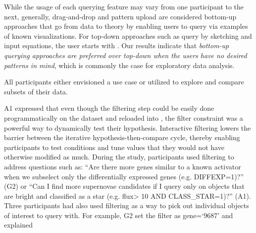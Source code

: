 \par While the usage of each querying feature may vary from one participant to the next, generally,  drag-and-drop and pattern upload are considered bottom-up approaches that go from data to theory by enabling users to query via examples of known visualizations. For top-down approaches such as query by sketching and input equations, the user starts with . Our results indicate that \emph{bottom-up querying approaches are preferred over top-down when the users have no desired patterns in mind}, which is commonly the case for exploratory data analysis.
\par All participants either envisioned a use case or utilized  to explore and compare subsets of their data. 
\par A1 expressed that even though the filtering step could be easily done programmatically on the dataset and reloaded into \zv, the filter constraint was a powerful way to dynamically test their hypothesis. Interactive filtering lowers the barrier between the iterative hypothesis-then-compare cycle, thereby enabling participants to test conditions and tune values that they would not have otherwise modified as much.
During the study, participants used filtering to address questions such as: ``Are there more genes similar to a known activator when we subselect only the differentially expressed genes (e.g. DIFFEXP=1)?'' (G2) or ``Can I find more supernovae candidates if I query only on objects that are bright and classified as a star (e.g. flux\textgreater
10 AND CLASS\_STAR=1)?'' (A1). Three participants had also used filtering as a way to pick out individual objects of interest to query with. For example, G2 set the filter as gene=`9687' and explained 
